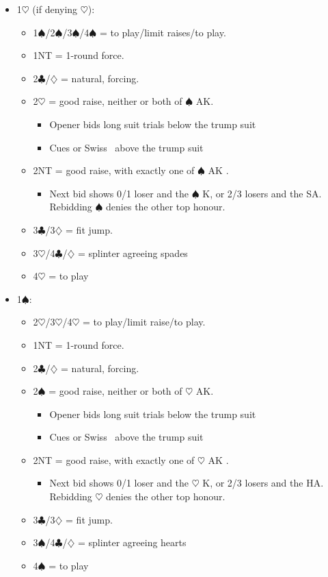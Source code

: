\documentclass[a4paper,14pt]{extarticle}
\begin{document}
\begin{itemize}
\item 1$\heartsuit$ (if denying $\heartsuit$):
	\begin{itemize}
   \item 1$\spadesuit$/2$\spadesuit$/3$\spadesuit$/4$\spadesuit$ = to play/limit raises/to play.
   \item 1NT = 1-round force.
   \item 2$\clubsuit$/$\diamondsuit$ = natural, forcing.
   \item 2$\heartsuit$ = good raise, neither or both of $\spadesuit$ AK.
		\begin{itemize}
		\item Opener bids long suit trials below the trump suit
		\item Cues or Swiss~ above the trump suit
		\end{itemize}
   \item 2NT = good raise, with exactly one of $\spadesuit$ AK .
		\begin{itemize}
      \item Next bid shows 0/1 loser and the $\spadesuit$ K, or 2/3 losers and the SA.
         Rebidding $\spadesuit$ denies the other top honour.
		\end{itemize}
   \item 3$\clubsuit$/3$\diamondsuit$ = fit jump.
   \item 3$\heartsuit$/4$\clubsuit$/$\diamondsuit$ = splinter agreeing spades
	\item 4$\heartsuit$ = to play
	\end{itemize}


\item 1$\spadesuit$:
	\begin{itemize}
   \item 2$\heartsuit$/3$\heartsuit$/4$\heartsuit$ = to play/limit raise/to play.
   \item 1NT = 1-round force.
   \item 2$\clubsuit$/$\diamondsuit$ = natural, forcing.
   \item 2$\spadesuit$ = good raise, neither or both of $\heartsuit$ AK.
		\begin{itemize}
		\item Opener bids long suit trials below the trump suit
		\item Cues or Swiss~ above the trump suit
		\end{itemize}
   \item 2NT = good raise, with exactly one of $\heartsuit$ AK .
		\begin{itemize}
      \item Next bid shows 0/1 loser and the $\heartsuit$ K, or 2/3 losers and the HA.
         Rebidding $\heartsuit$ denies the other top honour.
		\end{itemize}
   \item 3$\clubsuit$/3$\diamondsuit$ = fit jump.
   \item 3$\spadesuit$/4$\clubsuit$/$\diamondsuit$ = splinter agreeing hearts
   \item 4$\spadesuit$ = to play
	\end{itemize}


\end{itemize}
\end{document}
